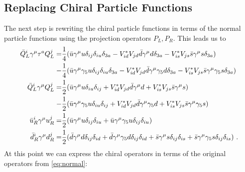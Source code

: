 \subsection{Replacing Chiral Particle Functions}
The next step is rewriting the chiral particle functions in terms of the normal particle functions using the projection operators $P_L,P_R$. This leads us to
\begin{align}
	\bar{Q}_L^i\gamma^\mu\tau^a Q_L^j =&\frac{1}{4}(\bar{u}\gamma^\mu u\delta_{ij}\delta_{iu}\delta_{3a}
	- V_{id}^*V_{jd}\bar{d}\gamma^\mu d\delta_{3a} - V_{is}^*V_{js}\bar{s}\gamma^\mu s\delta_{3a})\notag \\
	-&\frac{1}{4} (\bar{u}\gamma^\mu \gamma_5u\delta_{ij}\delta_{iu}\delta_{3a} - V_{id}^*V_{jd}\bar{d}\gamma^\mu\gamma_5 d\delta_{3a} - V_{is}^*V_{js}\bar{s}\gamma^\mu\gamma_5 s\delta_{3a})\notag \\
	\bar{Q}_L^i\gamma^\mu Q_L^j =&\frac{1}{2}(
	\bar{u}\gamma^\mu u\delta_{iu}\delta_{ij} + V_{id}^*V_{jd}\bar{d}\gamma^\mu d
	+ V_{is}^*V_{js}\bar{s}\gamma^\mu s)\notag \\
	-&\frac{1}{2}(\bar{u}\gamma^\mu\gamma_5u\delta_{iu}\delta_{ij} + V_{id}^*V_{jd}\bar{d}\gamma^\mu\gamma_5d + V_{is}^*V_{js}\bar{s}\gamma^\mu\gamma_5s)\notag \\
	\bar{u}_R^i\gamma^\mu u_R^j =&\frac{1}{2}(\bar{u}\gamma^\mu u\delta_{ij}\delta_{iu} + \bar{u}\gamma^\mu \gamma_5u\delta_{ij}\delta_{iu})\notag \\
	\bar{d}_R^i\gamma^\mu d_R^j =&\frac{1}{2}(\bar{d}\gamma^\mu d\delta_{ij}\delta_{id} + \bar{d}\gamma^\mu\gamma_5d\delta_{ij}\delta_{id} + \bar{s}\gamma^\mu s\delta_{ij}\delta_{is} + \bar{s}\gamma^\mu \gamma_5s\delta_{ij}\delta_{is}) \ .
\end{align}
At this point we can express the chiral operators in terms of the original operators from \eqref{eq:normal}:
